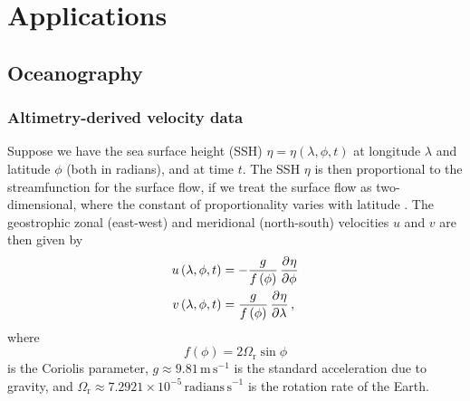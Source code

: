 \chapter{Applications}



\section{Oceanography}

\subsection{Altimetry-derived velocity data}

Suppose we have the sea surface height (SSH) \(\eta = \eta\left(\lambda, \phi, t\right)\) at longitude \(\lambda\) and latitude \(\phi\) (both in radians), and at time \(t\).
The SSH \(\eta\) is then proportional to the streamfunction for the surface flow, if we treat the surface flow as two-dimensional, where the constant of proportionality varies with latitude \citep{Park_2004_DeterminationSurfaceGeostrophic, DoglioniEtAl_2021_SeaSurfaceHeight}.
The geostrophic zonal (east-west) and meridional (north-south) velocities \(u\) and \(v\) are then given by
\begin{subequations}\label{eqn:}
	\begin{align}
		u\left(\lambda, \phi, t\right) & = -\frac{g}{f\left(\phi\right)}\dpd{\eta}{\phi} \label{eqn:altimetry_u}    \\
		v\left(\lambda, \phi, t\right) & = \frac{g}{f\left(\phi\right)}\dpd{\eta}{\lambda} \label{eqn:altimetry_v},
	\end{align}
\end{subequations}
\label{eqn:altimetry_uv}
where
\[
	f\left(\phi\right) = 2\Omega_{\mathrm{r}}\sin{\phi}
\]
is the Coriolis parameter, \(g \approx 9.81\mathrm{\,m\,s}^{-1}\) is the standard acceleration due to gravity, and \(\Omega_\mathrm{r} \approx 7.2921 \times 10^{-5}\mathrm{\,radians\,s}^{-1}\) is the rotation rate of the Earth.


